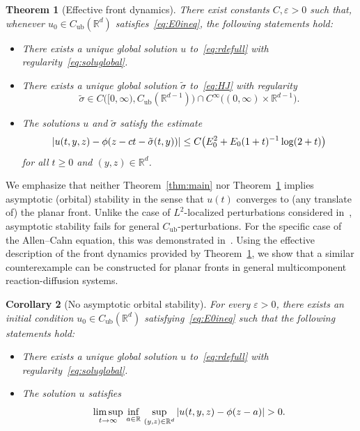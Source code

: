 \documentclass[12pt,oneside,a4paper,reqno]{amsart}
\numberwithin{equation}{section}
\newtheorem{theorem}{Theorem}[section]
\newtheorem{corollary}[theorem]{Corollary}
\theoremstyle{definition}
\theoremstyle{remark}
\newcommand{\bbR}{{\mathbb R}}
\newcommand{\eps}{\varepsilon}
\newcommand{\Cub}{{C_{\mathrm{ub}}}}
\DeclarePairedDelimiter{\abs}{\lvert}{\rvert}
\begin{document}
\begin{theorem}[Effective front dynamics]
	\label{thm:HJ}
    There exist constants $C,\eps > 0$ such that, whenever $u_0 \in \Cub(\bbR^d)$ satisfies~\eqref{eq:E0ineq}, the following statements hold:
    \begin{itemize}
        \item  There exists a unique global solution $u$ to~\eqref{eq:rdefull} with regularity~\eqref{eq:soluglobal}.
        \item There exists a unique global solution $\tilde{\sigma}$ to~\eqref{eq:HJ} with regularity
        \begin{equation}
            \label{eq:sigmatildereg}
            \tilde\sigma \in C\big([0,\infty),\Cub(\bbR^{d-1})\big) \cap C^\infty\big((0,\infty) \times \bbR^{d-1}\big).
        \end{equation}
        \item The solutions $u$ and $\tilde{\sigma}$ satisfy the estimate
        \begin{equation}
            \label{eq:HJeffest}
    		\abs{u(t,y,z) - \phi(z - ct - \tilde{\sigma}(t,y))} \leq C\big(E_0^2 + E_0(1+t)^{-1}\log(2+t)\big)
    	\end{equation}
        for all $t\geq 0$ and $(y,z) \in \bbR^d$.
    \end{itemize}
\end{theorem}

We emphasize that neither Theorem~\ref{thm:main} nor Theorem~\ref{thm:HJ} implies asymptotic (orbital) stability in the sense that $u(t)$ converges to (any translate of) the planar front.  
Unlike the case of $L^2$-localized perturbations considered in~\cite{kapitula_multidimensional_1997}, asymptotic stability fails for general $\Cub$-perturbations.  
For the specific case of the Allen--Cahn equation, this was demonstrated in~\cite[Proposition~1.9]{matano_stability_2009}.  
Using the effective description of the front dynamics provided by Theorem~\ref{thm:HJ}, we show that a similar counterexample can be constructed for planar fronts in general multicomponent reaction-diffusion systems.
\begin{corollary}[No asymptotic orbital stability]
    \label{cor:oscillating}
    For every $\eps > 0$, there exists an initial condition $u_0 \in \Cub(\bbR^d)$ satisfying~\eqref{eq:E0ineq} such that the following statements hold:
    \begin{itemize}
        \item There exists a unique global solution $u$ to~\eqref{eq:rdefull} with regularity~\eqref{eq:soluglobal}.
        \item The solution $u$ satisfies
        \begin{equation}
            \label{eq:infosc}
            \limsup_{t \to \infty} \, \inf_{a \in \bbR}
        \, \sup_{(y,z) \in \bbR^d} \, \abs{u(t,y,z) - \phi(z - a)} > 0.
        \end{equation}
    \end{itemize}
\end{corollary}
\end{document}
